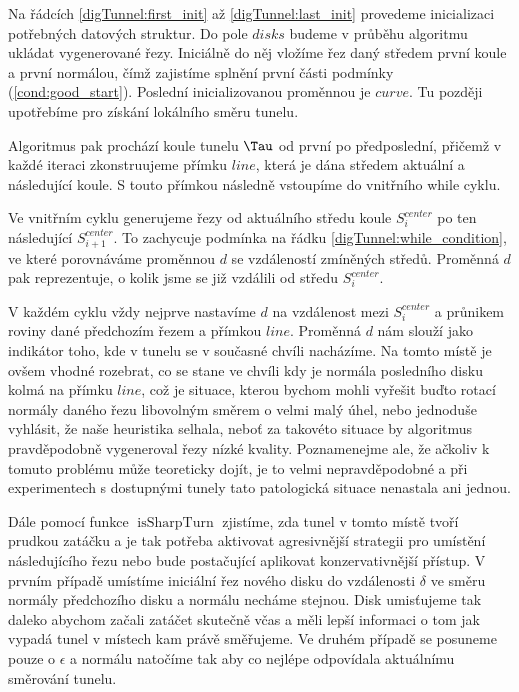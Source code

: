 Na řádcích \ref{digTunnel:first_init} až \ref{digTunnel:last_init} provedeme
inicializaci potřebných datových struktur. Do pole $ disks $ budeme
v průběhu algoritmu ukládat vygenerované řezy. Iniciálně do něj vložíme
řez daný středem první koule a první normálou, čímž zajistíme splnění první
části podmínky (\ref{cond:good_start}). Poslední inicializovanou proměnnou je
$ curve $. Tu později upotřebíme pro získání lokálního směru tunelu.

Algoritmus pak prochází koule tunelu $ \Tau $ od první po předposlední, přičemž
v každé iteraci zkonstruujeme přímku $ line $, která je dána středem aktuální
a následující koule. S touto přímkou následně vstoupíme do vnitřního while cyklu.

Ve vnitřním cyklu generujeme řezy od aktuálního středu koule $ S_{i}^{center} $
po ten následující $ S_{i + 1}^{center} $. To zachycuje podmínka
na řádku \ref{digTunnel:while_condition}, ve které porovnáváme
proměnnou $ d $ se vzdáleností zmíněných středů. Proměnná $ d $ pak reprezentuje,
o kolik jsme se již vzdálili od středu $ S_{i}^{center} $.

V každém cyklu vždy nejprve nastavíme $ d $ na vzdálenost mezi $ S_{i}^{center} $ a
průnikem roviny dané předchozím řezem a přímkou $ line $. Proměnná $ d $ nám
slouží jako indikátor toho, kde v tunelu se v současné chvíli nacházíme.
Na tomto místě je ovšem vhodné rozebrat, co se stane ve chvíli kdy je normála
posledního disku kolmá na přímku $ line $, což je situace, kterou bychom mohli
vyřešit buďto rotací normály daného řezu libovolným směrem o velmi malý úhel,
nebo jednoduše vyhlásit, že naše heuristika selhala, neboť za
takovéto situace by algoritmus pravděpodobně vygeneroval řezy nízké kvality.
Poznamenejme ale, že ačkoliv k tomuto problému může teoreticky dojít, je to
velmi nepravděpodobné a při experimentech s dostupnými tunely tato patologická
situace nenastala ani jednou.

Dále pomocí funkce $ \operatorname{isSharpTurn} $ zjistíme, zda tunel v tomto
místě tvoří prudkou zatáčku a je tak potřeba aktivovat agresivnější strategii pro
umístění následujícího řezu nebo bude postačující aplikovat konzervativnější
přístup. V prvním případě umístíme iniciální řez nového disku do vzdálenosti
$ \delta $ ve směru normály předchozího disku a normálu necháme stejnou. Disk
umisťujeme tak daleko abychom začali zatáčet skutečně včas a měli lepší
informaci o tom jak vypadá tunel v místech kam právě směřujeme. Ve druhém případě
se posuneme pouze o $ \epsilon $ a normálu natočíme tak aby co nejlépe odpovídala
aktuálnímu směrování tunelu.

